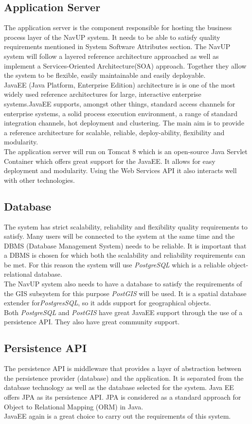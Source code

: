\subsection{Application Server}
The application server is the component responsible for hosting the business process layer of the NavUP system. It needs to be able to satisfy quality requirements mentioned in System Software Attributes section. The NavUP system will follow a layered reference architecture approached as well as implement a Services-Oriented Architecture(SOA) approach. Together they allow the system to be flexible, easily maintainable and easily deployable. \\[0.2cm]
JavaEE (Java Platform, Enterprise Edition) architecture is is one of the most widely used
reference architectures for large, interactive enterprise systems.JavaEE supports, amongst other things, standard access channels for enterprise systems, a solid process execution environment, a range of standard integration channels, hot deployment and clustering. The main aim is to provide a reference architecture for scalable, reliable, deploy-ability, flexibility and modularity. \\[0.2cm]
The application server will run on Tomcat 8 which is an open-source Java Servlet Container which offers great support for the JavaEE. It allows for easy deployment and modularity. Using the Web Services API it also interacts well with other technologies. 
\subsection{Database}
The system has strict scalability, reliability and flexibility quality requirements to satisfy. Many users will be connected to the system at the same time and the DBMS (Database Management System) needs to be reliable. It is important that a DBMS is chosen for which both the scalability and reliability requirements can be met. For this reason the system will use \textit{PostgreSQL} which is a reliable object-relational database. \\[0.2cm]
The NavUP system also needs to have a database to satisfy the requirements of the GIS subsystem for this purpose \textit{PostGIS} will be used. It is a spatial database extender for\textit{PostgresSQL}, so it adds support for geographical objects.  \\[0.2cm]
Both \textit{PostgreSQL} and \textit{PostGIS} have great JavaEE support through the use of a persistence API. They also have great community support.
\subsection{Persistence API}
The persistence API is middleware that provides a layer of abstraction between the  persistence provider (database) and the application. It is separated from the database technology as well as the  database selected for the system. Java EE offers JPA as its persistence API. JPA is considered as a standard approach for Object to Relational Mapping (ORM) in Java.\\ [0.2cm]
JavaEE again is a great choice to carry out the requirements of this system.

